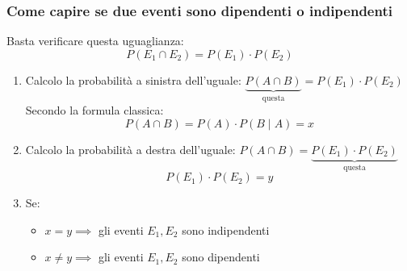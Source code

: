 \documentclass{article}  %
\theoremstyle{definition}
\begin{document}
\subsubsection{Come capire se due eventi sono dipendenti o indipendenti}
Basta verificare questa uguaglianza:
\[
	P(E_1 \cap E_2)=P(E_1) \cdot P(E_2)
\]
\begin{enumerate}
	\item Calcolo la probabilità a sinistra dell'uguale: $\underbrace{P(A \cap B)}_{\text{questa}}
		      = P(E_1) \cdot P(E_2)$ \\
	      Secondo la formula classica:
	      \[
		      P(A \cap B)=P(A) \cdot P(B \mid A)=x
	      \]
	\item Calcolo la probabilità a destra dell'uguale: $P(A \cap B)
		      =\underbrace{P(E_1) \cdot P(E_2)}_{\text{questa}}$ \\
	      \[
		      P(E_1) \cdot P(E_2)=y
	      \]
	\item Se:
	      \begin{itemize}
		      \item $x=y \implies$ gli eventi $E_1,E_2$ sono indipendenti
		      \item $x \neq y \implies$ gli eventi $E_1,E_2$ sono dipendenti
	      \end{itemize}
\end{enumerate}
\end{document}
